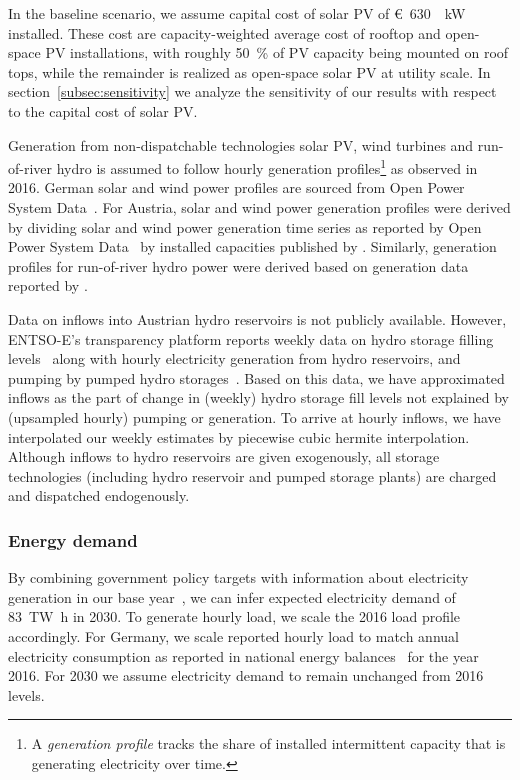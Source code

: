 \documentclass[review, 3p, times, 12pt]{elsarticle} %
\begin{document}
In the baseline scenario, we assume capital cost of solar PV of \SI{630}[\euro]{\per\kilo\watt} installed.
These cost are capacity-weighted average cost of rooftop and open-space PV installations, with roughly \SI{50}{\percent} of PV capacity being mounted on roof tops, while the remainder is realized as open-space solar PV at utility scale.
In section~\ref{subsec:sensitivity} we analyze the sensitivity of our results with respect to the capital cost of solar PV\@.

Generation from non-dispatchable technologies solar PV, wind turbines and run-of-river hydro is assumed to follow hourly generation profiles\footnote{A \emph{generation profile} tracks the share of installed intermittent capacity that is generating electricity over time.} as observed in 2016.
German solar and wind power profiles are sourced from Open Power System Data~\citep{opsd2019}.
For Austria, solar and wind power generation profiles were derived by dividing solar and wind power generation time series as reported by Open Power System Data~\cite{opsd2019} by installed capacities published by \cite{Biermayr2019}.
Similarly, generation profiles for run-of-river hydro power were derived based on generation data reported by \cite{ENTSOE2020b}.

Data on inflows into Austrian hydro reservoirs is not publicly available.
However, ENTSO-E's transparency platform reports weekly data on hydro storage filling levels~\cite{ENTSOE2020a} along with hourly electricity generation from hydro reservoirs, and pumping by pumped hydro storages~\cite{ENTSOE2020b}.
Based on this data, we have approximated inflows as the part of change in (weekly) hydro storage fill levels not explained by (upsampled hourly) pumping or generation.
To arrive at hourly inflows, we have interpolated our weekly estimates by piecewise cubic hermite interpolation.
Although inflows to hydro reservoirs are given exogenously, all storage technologies (including hydro reservoir and pumped storage plants) are charged and dispatched endogenously.

\subsubsection{Energy demand}\label{subsec:energy-demand}
By combining government policy targets with information about electricity generation in our base
year~\citep{StatistikAustria2020}, we can infer expected electricity demand of \SI{83}{\tera\watt\hour} in 2030.
To generate hourly load, we scale the 2016 load profile accordingly.
For Germany, we scale reported hourly load to match annual electricity consumption as reported in national energy balances~\citep{AGEB2018} for the year 2016.
For 2030 we assume electricity demand to remain unchanged from 2016 levels.
\end{document}
